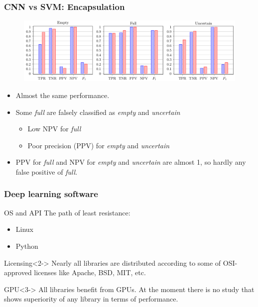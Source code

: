 \documentclass{beamer}
\begin{document}
\begin{frame}
\frametitle{CNN vs SVM: Encapsulation}

\begin{figure}
\centering
\includegraphics[width=\linewidth,height=0.8\textheight,keepaspectratio]{cnn_vs_svm_encapsulation.png} 
\end{figure}

\begin{itemize}
\item Almost the same performance.
\item Some \textit{full} are falsely classified as \textit{empty} and \textit{uncertain}
\begin{itemize}
\item Low NPV for \textit{full}
\item Poor precision (PPV) for \textit{empty} and \textit{uncertain}
\end{itemize}
\item PPV for \textit{full} and NPV for \textit{empty} and \textit{uncertain} are almost 1, so hardly any false positive of \textit{full}.
\end{itemize}

\end{frame}

%
%

\begin{frame}
\frametitle{Deep learning software}

\begin{block}{OS and API}
The path of least resistance:
\begin{itemize}
\item Linux
\item Python
\end{itemize}
\end{block}

\begin{block}{Licensing}<2->
Nearly all libraries are distributed according to some of OSI-approved licenses like Apache, BSD, MIT, etc.
\end{block}

\begin{block}{GPU}<3->
All libraries benefit from GPUs. At the moment there is no study that shows superiority of any library in terms of performance.
\end{block}

\end{frame}
\end{document}
